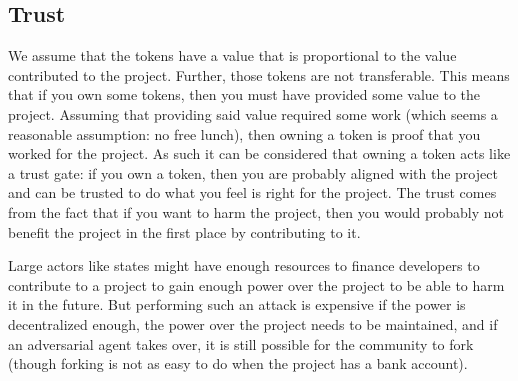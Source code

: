 \subsection{Trust}

We assume that the tokens have a value that is proportional to the value contributed to the project.
Further, those tokens are not transferable.
This means that if you own some tokens, then you must have provided some value to the project.
Assuming that providing said value required some work (which seems a reasonable assumption: no free lunch), then owning a token is proof that you worked for the project.
As such it can be considered that owning a token acts like a trust gate: if you own a token, then you are probably aligned with the project and can be trusted to do what you feel is right for the project.
The trust comes from the fact that if you want to harm the project, then you would probably not benefit the project in the first place by contributing to it.

Large actors like states might have enough resources to finance developers to contribute to a project to gain enough power over the project to be able to harm it in the future.
But performing such an attack is expensive if the power is decentralized enough, the power over the project needs to be maintained, and if an adversarial agent takes over, it is still possible for the community to fork (though forking is not as easy to do when the project has a bank account).

